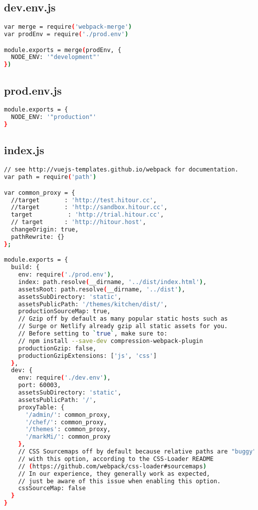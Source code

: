 \subsection{dev.env.js}


\begin{lstlisting}[language=bash]
var merge = require('webpack-merge')
var prodEnv = require('./prod.env')

module.exports = merge(prodEnv, {
  NODE_ENV: '"development"'
})
\end{lstlisting}


\subsection{prod.env.js}



\begin{lstlisting}[language=bash]
module.exports = {
  NODE_ENV: '"production"'
}
\end{lstlisting}

\subsection{index.js}

\begin{lstlisting}[language=bash]
// see http://vuejs-templates.github.io/webpack for documentation.
var path = require('path')

var common_proxy = {
  //target       : 'http://test.hitour.cc',
  //target       : 'http://sandbox.hitour.cc',
  target          : 'http://trial.hitour.cc',
  // target      : 'http://hitour.host',
  changeOrigin: true,
  pathRewrite: {}
};

module.exports = {
  build: {
    env: require('./prod.env'),
    index: path.resolve(__dirname, '../dist/index.html'),
    assetsRoot: path.resolve(__dirname, '../dist'),
    assetsSubDirectory: 'static',
    assetsPublicPath: '/themes/kitchen/dist/',
    productionSourceMap: true,
    // Gzip off by default as many popular static hosts such as
    // Surge or Netlify already gzip all static assets for you.
    // Before setting to `true`, make sure to:
    // npm install --save-dev compression-webpack-plugin
    productionGzip: false,
    productionGzipExtensions: ['js', 'css']
  },
  dev: {
    env: require('./dev.env'),
    port: 60003,
    assetsSubDirectory: 'static',
    assetsPublicPath: '/',
    proxyTable: {
      '/admin/': common_proxy,
      '/chef/': common_proxy,
      '/themes': common_proxy,
      '/markMi/': common_proxy
    },
    // CSS Sourcemaps off by default because relative paths are "buggy"
    // with this option, according to the CSS-Loader README
    // (https://github.com/webpack/css-loader#sourcemaps)
    // In our experience, they generally work as expected,
    // just be aware of this issue when enabling this option.
    cssSourceMap: false
  }
}
\end{lstlisting}

